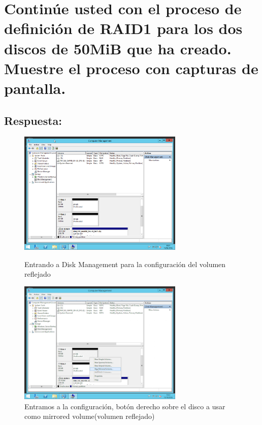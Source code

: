 \section{Continúe usted con el proceso de definición de RAID1 para los dos discos de 50MiB que ha creado. Muestre el proceso con capturas de pantalla.}
\subsection{Respuesta:}
\begin{figure}[H]
	\begin{center}
		\includegraphics[width=0.7\textwidth]{Imagenes/01_Inicio-configuracion-RAID_1}
		\caption{Entrando a Disk Management para la configuración del volumen reflejado} \label{fig:figura11}
		
		\includegraphics[width=0.7\textwidth]{Imagenes/02_Entrando-a-configurar-volumen-reflejado}
		\caption{Entramos a la configuración, botón derecho sobre el disco a usar como mirrored volume(volumen reflejado)} \label{fig:figura12}
	\end{center}
\end{figure}

